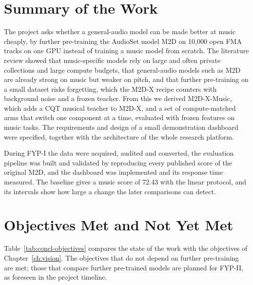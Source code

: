 \section{Summary of the Work}
\label{sec:concl-summary}
The project asks whether a general-audio model can be made better at music cheaply, by further pre-training the AudioSet model M2D on 10,000 open FMA tracks on one GPU instead of training a music model from scratch. The literature review showed that music-specific models rely on large and often private collections and large compute budgets, that general-audio models such as M2D are already strong on music but weaker on pitch, and that further pre-training on a small dataset risks forgetting, which the M2D-X recipe counters with background noise and a frozen teacher. From this we derived M2D-X-Music, which adds a CQT musical teacher to M2D-X, and a set of compute-matched arms that switch one component at a time, evaluated with frozen features on music tasks. The requirements and design of a small demonstration dashboard were specified, together with the architecture of the whole research platform.

During FYP-I the data were acquired, audited and converted, the evaluation pipeline was built and validated by reproducing every published score of the original M2D, and the dashboard was implemented and its response time measured. The baseline gives a music score of 72.43 with the linear protocol, and its intervals show how large a change the later comparisons can detect.

\section{Objectives Met and Not Yet Met}
\label{sec:concl-objectives}
Table~\ref{tab:concl-objectives} compares the state of the work with the objectives of Chapter~\ref{ch:vision}. The objectives that do not depend on further pre-training are met; those that compare further pre-trained models are planned for FYP-II, as foreseen in the project timeline.

